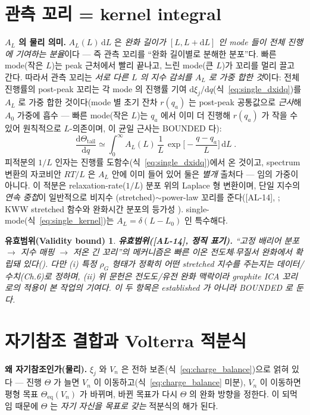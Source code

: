 \documentclass[11pt,a4paper]{article}
\newtheorem*{boundbox}{유효범위(Validity bound)}
\newcommand{\dd}{\mathrm{d}}
\newcommand{\eq}{\mathrm{eq}}
\newcommand{\AL}[1]{\textsf{[AL-#1]}}
\begin{document}
\section{관측 꼬리 = kernel integral}\label{sec:kernel}
\textbf{$A_L$ 의 물리 의미.} $A_L(L)\,\dd L$ 은 \emph{완화 길이가 $[L,L+\dd L]$ 인 mode 들이 전체 진행에 기여하는
분율}이다 — 즉 관측 꼬리를 ``완화 길이별로 분해한 분포''다. 빠른 mode(작은 $L$)는 peak 근처에서 빨리 끝나고,
느린 mode(큰 $L$)가 꼬리를 멀리 끌고 간다. 따라서 관측 꼬리는 \emph{서로 다른 $L$ 의 지수 감쇠를 $A_L$ 로 가중
합한 것}이다: 전체 진행률의 post-peak 꼬리는 각 mode 의 진행률 기여 $\dd\xi_j/\dd q$(식~\eqref{eq:single_dxidq})를
$A_L$ 로 가중 합한 것이다(mode 별 초기 잔차 $r(q_a)$ 는 post-peak 공통값으로 \emph{근사}해 $A_0$ 가중에 흡수 —
빠른 mode(작은 $L$)는 $q_a$ 에서 이미 더 진행해 $r(q_a)$ 가 작을 수 있어 원칙적으로 $L$-의존이며, 이 균일 근사는
BOUNDED 다):
\begin{equation}
\boxed{\;\frac{\dd\Theta_\mathrm{tail}}{\dd q}\simeq\int_0^\infty A_L(L)\,\frac1L\,
\exp\!\Big[-\frac{q-q_a}{L}\Big]\,\dd L\;.}
\label{eq:kernel_integral}
\end{equation}
피적분의 $1/L$ 인자는 진행률 도함수(식~\eqref{eq:single_dxidq})에서 온 것이고, spectrum 변환의 자코비안
$RT/L$ 은 $A_L$ 안에 이미 들어 있어 둘은 \emph{별개} 출처다 — 임의 가중이 아니다. 이 적분은
relaxation-rate($1/L$) 분포 위의 Laplace 형 변환이며, 단일 지수의 \emph{연속 중첩}이 일반적으로 비지수
(stretched)$\sim$power-law 꼬리를 준다(\AL{14}, \cite{johnston2006}; KWW stretched 함수와 완화시간 분포의
등가성 \cite{lindsey1980}). single-mode(식~\eqref{eq:single_kernel})는 $A_L=\delta(L-L_0)$ 인 특수해다.
\begin{boundbox}
\textbf{유효범위(\AL{14}, 정직 표기).} ``고정 배리어 분포 $\to$ 지수 매핑 $\to$ 저온 긴 꼬리''의 메커니즘은
빠른 이온 전도체$\cdot$무질서 완화에서 확립돼 있다(\cite{svare2000,johnston2006,lindsey1980}). 다만 (i)
특정 $\rho_G$ 형태가 \emph{정확히 어떤} stretched 지수를 주는지는 데이터/수치(Ch.6)로 정하며, (ii) 위
문헌은 전도도/유전 완화 맥락이라 graphite ICA 꼬리로의 \emph{적용}이 본 작업의 기여다. 이 두 항목은
established 가 아니라 BOUNDED 로 둔다.
\end{boundbox}

\section{자기참조 결합과 Volterra 적분식}\label{sec:volterra}
\textbf{왜 자기참조인가(물리).} $\xi_j$ 와 $V_n$ 은 전하 보존(식~\eqref{eq:charge_balance})으로 얽혀 있다 — 진행
$\Theta$ 가 늘면 $V_n$ 이 이동하고(식~\eqref{eq:charge_balance} 미분), $V_n$ 이 이동하면 평형 목표
$\Theta_\eq(V_n)$ 가 바뀌며, 바뀐 목표가 다시 $\Theta$ 의 완화 방향을 정한다. 이 되먹임 때문에 $\Theta$ 는 \emph{자기
자신을 목표로 갖는} 적분식의 해가 된다.
\end{document}
